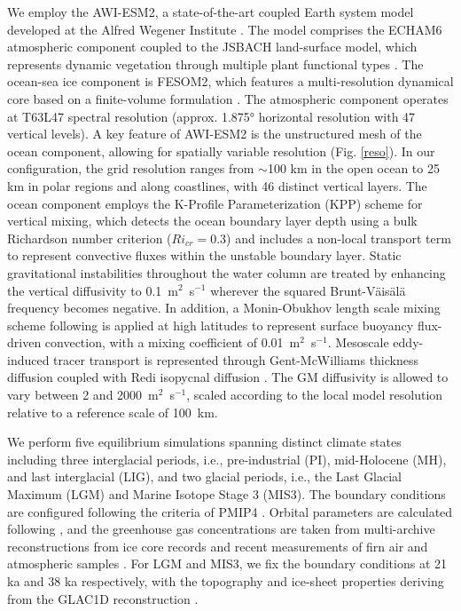 \documentclass[pdflatex,sn-nature]{sn-jnl}
\begin{document}
We employ the AWI-ESM2, a state-of-the-art coupled Earth system model developed at the Alfred Wegener Institute \cite{sidorenko2019evaluation}. The model comprises the ECHAM6 atmospheric component \cite{stevens2013atmospheric} coupled to the JSBACH land-surface model, which represents dynamic vegetation through multiple plant functional types \cite{brovkin2009global,reick2021jsbach}. The ocean-sea ice component is FESOM2, which features a multi-resolution dynamical core based on a finite-volume formulation \cite{danilov2017finite}. The atmospheric component operates at T63L47 spectral resolution (approx. 1.875° horizontal resolution with 47 vertical levels). A key feature of AWI-ESM2 is the unstructured mesh of the ocean component, allowing for spatially variable resolution (Fig. \ref{reso}). In our configuration, the grid resolution ranges from $\sim$100 km in the open ocean to 25 km in polar regions and along coastlines, with 46 distinct vertical layers.
  The ocean component employs the K-Profile Parameterization (KPP) scheme
  \cite{large1994oceanic} for vertical mixing, which detects the ocean boundary
  layer depth using a bulk Richardson number criterion ($Ri_{cr} = 0.3$) and
  includes a non-local transport term to represent convective fluxes within the
  unstable boundary layer. Static gravitational instabilities throughout the water
  column are treated by enhancing the vertical diffusivity to 0.1~m$^2$~s$^{-1}$
  wherever the squared Brunt-V\"{a}is\"{a}l\"{a} frequency becomes negative.
  In addition, a Monin-Obukhov length scale mixing scheme following
  \cite{timmermann2004parameterization} is applied at high latitudes to represent
  surface buoyancy flux-driven convection, with a mixing coefficient of
  0.01~m$^2$~s$^{-1}$. Mesoscale eddy-induced tracer transport is represented through
  Gent-McWilliams thickness diffusion \cite{gent1990isopycnal,ferrari2008parameterization}
  coupled with Redi isopycnal diffusion \cite{redi1982oceanic}.  The GM diffusivity
  is allowed to vary between 2 and 2000~m$^2$~s$^{-1}$, scaled according to the
  local model resolution relative to a reference scale of 100~km.

We perform five equilibrium simulations spanning distinct climate states including three interglacial periods, i.e., pre-industrial (PI), mid-Holocene (MH), and last interglacial (LIG), and two glacial periods, i.e., the Last Glacial Maximum (LGM) and Marine Isotope Stage 3 (MIS3). The boundary conditions are configured following the criteria of PMIP4 \cite{otto2017pmip4}. Orbital parameters are calculated following \cite{berger1977long}, and the greenhouse gas concentrations are taken from multi-archive reconstructions from ice core records and recent measurements of firn air and atmospheric samples \cite{fluckiger2002high,monnin2004evidence,schilt2010glacial,buiron2011taldice,schneider2013reconstruction,kohler2017156}.  For LGM and MIS3, we fix the boundary conditions at 21 ka and 38 ka respectively, with the topography and ice-sheet properties deriving from the GLAC1D reconstruction \cite{tarasov2003greenland,tarasov2012data,briggs2014data}.
\end{document}
